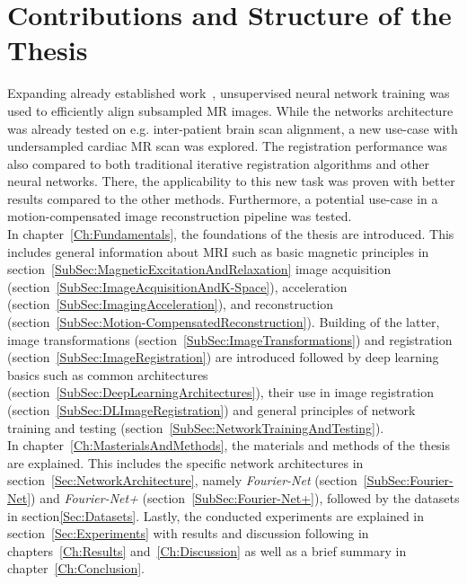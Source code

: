\section{Contributions and Structure of the Thesis} \label{Sec:ContributionsAndStructure}
Expanding already established work~\cite{Fourier-Net,Fourier-Net+}, unsupervised neural network training was used to efficiently align subsampled MR images. While the networks architecture was already tested on e.g. inter-patient brain scan alignment, a new use-case with undersampled cardiac MR scan was explored. The registration performance was also compared to both traditional iterative registration algorithms and other neural networks. There, the applicability to this new task was proven with better results compared to the other methods. Furthermore, a potential use-case in a motion-compensated image reconstruction pipeline was tested.\\
In chapter~\ref{Ch:Fundamentals}, the foundations of the thesis are introduced. This includes general information about MRI such as basic magnetic principles in section~\ref{SubSec:MagneticExcitationAndRelaxation} image acquisition (section~\ref{SubSec:ImageAcquisitionAndK-Space}), acceleration (section~\ref{SubSec:ImagingAcceleration}), and reconstruction (section~\ref{SubSec:Motion-CompensatedReconstruction}). Building of the latter, image transformations (section~\ref{SubSec:ImageTransformations}) and registration (section~\ref{SubSec:ImageRegistration}) are introduced followed by deep learning basics such as common architectures (section~\ref{SubSec:DeepLearningArchitectures}), their use in image registration (section~\ref{SubSec:DLImageRegistration}) and general principles of network training and testing (section~\ref{SubSec:NetworkTrainingAndTesting}).\\
In chapter~\ref{Ch:MasterialsAndMethods}, the materials and methods of the thesis are explained. This includes the specific network architectures in section~\ref{Sec:NetworkArchitecture}, namely \emph{Fourier-Net} (section~\ref{SubSec:Fourier-Net}) and \emph{Fourier-Net+} (section~\ref{SubSec:Fourier-Net+}), followed by the datasets in section\ref{Sec:Datasets}.
Lastly, the conducted experiments are explained in section~\ref{Sec:Experiments} with results and discussion following in chapters~\ref{Ch:Results} and~\ref{Ch:Discussion} as well as a brief summary in chapter~\ref{Ch:Conclusion}.
